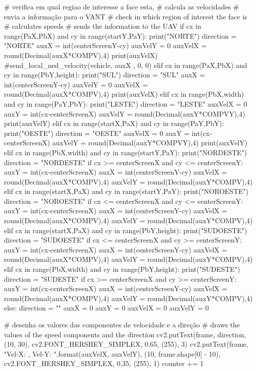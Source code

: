 \begin{apendicesenv}
\begin{python_}
		# verifica em qual regiao de interesse a face esta,
		# calcula as velocidades
		# envia a informação para o VANT
		# check in which region of interest the face is
		# calculates speeds
		# sends the information to the UAV
		if cx in range(PaX,PbX) and cy in range(startY,PaY):
			print("NORTE")
			direction = "NORTE"
			auxX = int(centerScreenY-cy)
			auxVelY = 0
			auxVelX = round(Decimal(auxX*COMPV),4)
			print(auxVelX)
			#send_local_ned_velocity(vehicle, auxX , 0, 0)
		elif cx in range(PaX,PbX) and cy in range(PbY,height):
			print("SUL")
			direction = "SUL"
			auxX = int(centerScreenY-cy)
			auxVelY = 0
			auxVelX = round(Decimal(auxX*COMPV),4)
			print(auxVelX)
		elif cx in range(PbX,width) and cy in range(PaY,PbY):
			print("LESTE")
			direction = "LESTE"
			auxVelX = 0
			auxY = int(cx-centerScreenX)
			auxVelY = round(Decimal(auxY*COMPVY),4)	
			print(auxVelY)
		elif cx in range(startX,PaX) and cy in range(PaY,PbY):
			print("OESTE")
			direction = "OESTE"	
			auxVelX = 0
			auxY = int(cx-centerScreenX)
			auxVelY = round(Decimal(auxY*COMPVY),4)
			print(auxVelY)
		elif cx in range(PbX,width) and cy in range(startY,PaY):
			print("NORDESTE")
			direction = "NORDESTE"
			if cx >= centerScreenX and cy <= centerScreenY:
				auxY = int(cx-centerScreenX)
				auxX = int(centerScreenY-cy)
				auxVelX = round(Decimal(auxX*COMPV),4)
				auxVelY = round(Decimal(auxY*COMPV),4)
		elif cx in range(startX,PaX) and cy in range(startY,PaY):
			print("NOROESTE")
			direction = "NOROESTE"
			if cx <= centerScreenX and cy <= centerScreenY:
				auxY = int(cx-centerScreenX)
				auxX = int(centerScreenY-cy)
				auxVelX = round(Decimal(auxX*COMPV),4)
				auxVelY = round(Decimal(auxY*COMPV),4)
		elif cx in range(startX,PaX) and cy in range(PbY,height):
			print("SUDOESTE")
			direction = "SUDOESTE"
			if cx <= centerScreenX and cy >= centerScreenY:
				auxY = int(cx-centerScreenX)
				auxX = int(centerScreenY-cy)
				auxVelX = round(Decimal(auxX*COMPV),4)
				auxVelY = round(Decimal(auxY*COMPV),4)
		elif cx in range(PbX,width) and cy in range(PbY,height):
			print("SUDESTE")
			direction = "SUDESTE"
			if cx >= centerScreenX and cy >= centerScreenY:
				auxY = int(cx-centerScreenX)
				auxX = int(centerScreenY-cy)
				auxVelX = round(Decimal(auxX*COMPV),4)
				auxVelY = round(Decimal(auxY*COMPV),4)
		else:
			direction = ""
			auxX = 0
			auxY = 0
			auxVelX = 0
			auxVelY = 0
	
	# desenha os valores das componentes de velocidade e a direção
	# draws the values of the speed components and the direction
	cv2.putText(frame, direction, (10, 30), cv2.FONT_HERSHEY_SIMPLEX,
	0.65, (255), 3)
	cv2.putText(frame, "Vel-X: {}, Vel-Y: {}".format(auxVelX, auxVelY),
	(10, frame.shape[0] - 10), cv2.FONT_HERSHEY_SIMPLEX,
	0.35, (255), 1)
	counter += 1
	

\end{python_}
\end{apendicesenv}
